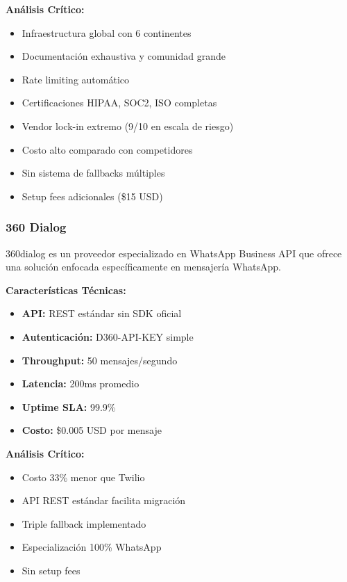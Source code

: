 \documentclass{article}
\begin{document}
\textbf{Análisis Crítico:}
\begin{itemize}[label=\textcolor{successgreen}{$\checkmark$}]
    \item Infraestructura global con 6 continentes
    \item Documentación exhaustiva y comunidad grande
    \item Rate limiting automático
    \item Certificaciones HIPAA, SOC2, ISO completas
\end{itemize}

\begin{itemize}[label=\textcolor{errorred}{$\times$}]
    \item Vendor lock-in extremo (9/10 en escala de riesgo)
    \item Costo alto comparado con competidores
    \item Sin sistema de fallbacks múltiples
    \item Setup fees adicionales (\$15 USD)
\end{itemize}

\subsubsection{360 Dialog}
\textnormal{360dialog es un proveedor especializado en WhatsApp Business API que ofrece una solución enfocada específicamente en mensajería WhatsApp.}

\textbf{Características Técnicas:}
\begin{itemize}
    \item \textbf{API:} REST estándar sin SDK oficial
    \item \textbf{Autenticación:} D360-API-KEY simple
    \item \textbf{Throughput:} 50 mensajes/segundo
    \item \textbf{Latencia:} 200ms promedio
    \item \textbf{Uptime SLA:} 99.9\%
    \item \textbf{Costo:} \$0.005 USD por mensaje
\end{itemize}

\textbf{Análisis Crítico:}
\begin{itemize}[label=\textcolor{successgreen}{$\checkmark$}]
    \item Costo 33\% menor que Twilio
    \item API REST estándar facilita migración
    \item Triple fallback implementado
    \item Especialización 100\% WhatsApp
    \item Sin setup fees
\end{itemize}
\end{document}
